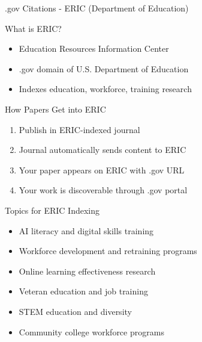 \documentclass[11pt]{beamer}
\begin{document}
	\begin{frame}{.gov Citations - ERIC (Department of Education)}
		\scriptsize
		\begin{block}{What is ERIC?}
			\begin{itemize}
				\item Education Resources Information Center
				\item .gov domain of U.S. Department of Education
				\item Indexes education, workforce, training research
			\end{itemize}
		\end{block}
		\begin{block}{How Papers Get into ERIC}
			\begin{enumerate}
				\item Publish in ERIC-indexed journal
				\item Journal automatically sends content to ERIC
				\item Your paper appears on ERIC with .gov URL
				\item Your work is discoverable through .gov portal
			\end{enumerate}
		\end{block}
		\begin{block}{Topics for ERIC Indexing}
			\begin{itemize}
				\item AI literacy and digital skills training
				\item Workforce development and retraining programs
				\item Online learning effectiveness research
				\item Veteran education and job training
				\item STEM education and diversity
				\item Community college workforce programs
			\end{itemize}
		\end{block}
	\end{frame}
	
\end{document}
